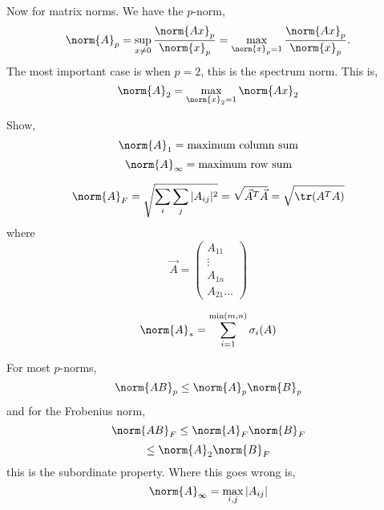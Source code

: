 \noindent
Now for matrix norms. We have the $p$-norm,
$$ \norm{A}_p = \sup_{x \ne 0} \frac{\norm{Ax}_p}{\norm{x}_p} = \max_{\norm{x}_p = 1} \frac{\norm{Ax}_p}{\norm{x}_p}.$$
The most important case is when $p = 2$, this is the spectrum norm. This is,
$$ \norm{A}_2 = \max_{\norm{x}_2 = 1} \norm{Ax}_2 $$

\begin{exercise}
  Show,
  $$ \norm{A}_1 = \text{maximum column sum} $$
  $$ \norm{A}_\infty = \text{maximum row sum} $$
\end{exercise}

\begin{ndefi}
  $$ \norm{A}_F = \sqrt{\sum_i\sum_j |A_{ij}|^2} = \sqrt{\vec A^T\vec A} = \sqrt{\tr(A^TA)}$$
  where
  $$ \vec A = \begin{pmatrix}
    A_{11} \\ \vdots \\ A_{1n} \\ A_{21} \dots
  \end{pmatrix} $$
\end{ndefi}

\begin{ndefi}
  $$ \norm{A}_* = \sum_{i=1}^{\min(m, n)} \sigma_i(A) $$
\end{ndefi}

For most $p$-norms,
$$ \norm{AB}_p \le \norm{A}_p\norm{B}_p $$
and for the Frobenius norm,
$$ \norm{AB}_F \le \norm{A}_F\norm{B}_F $$
$$ \le \norm{A}_2\norm{B}_F $$
this is the subordinate property. Where this goes wrong is,
$$ \norm{A}_\infty = \max_{i, j} |A_{ij}  | $$